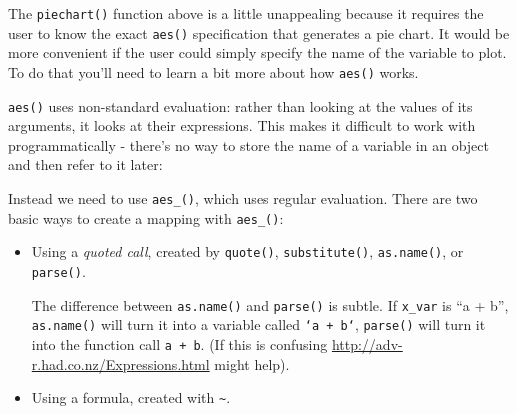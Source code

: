 The \texttt{piechart()} function above is a little unappealing because
it requires the user to know the exact \texttt{aes()} specification that
generates a pie chart. It would be more convenient if the user could
simply specify the name of the variable to plot. To do that you'll need
to learn a bit more about how \texttt{aes()} works.

\texttt{aes()} uses non-standard evaluation: rather than looking at the
values of its arguments, it looks at their expressions. This makes it
difficult to work with programmatically - there's no way to store the
name of a variable in an object and then refer to it later:

\begin{Shaded}
\begin{Highlighting}[]
\end{Highlighting}
\end{Shaded}

Instead we need to use \texttt{aes\_()}, which uses regular evaluation.
There are two basic ways to create a mapping with \texttt{aes\_()}:

\begin{itemize}
\item
  Using a \emph{quoted call}, created by \texttt{quote()},
  \texttt{substitute()}, \texttt{as.name()}, or \texttt{parse()}.
     

\begin{Shaded}
\begin{Highlighting}[]
\NormalTok{(}
\NormalTok{(}
\NormalTok{(}\NormalTok{(} \NormalTok{x_var)[[}\NormalTok{]])}

\StringTok{ }
  \NormalTok{(}
\NormalTok{\}}
\end{Highlighting}
\end{Shaded}

  The difference between \texttt{as.name()} and \texttt{parse()} is
  subtle. If \texttt{x\_var} is ``a + b'', \texttt{as.name()} will turn
  it into a variable called \texttt{`a + b`}, \texttt{parse()} will turn
  it into the function call \texttt{a + b}. (If this is confusing
  \url{http://adv-r.had.co.nz/Expressions.html} might help).
\item
  Using a formula, created with \texttt{\textasciitilde{}}.
  \indexc{\textasciitilde}

\begin{Shaded}
\begin{Highlighting}[]
\end{Highlighting}
\end{Shaded}
\end{itemize}

